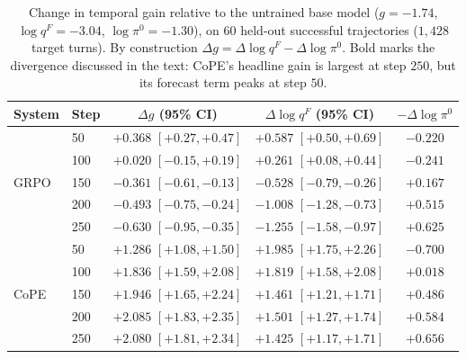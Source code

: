\begin{table}[t]
\centering
\small
\setlength{\tabcolsep}{5pt}
\begin{tabular}{llccc}
\toprule
System & Step & $\Delta g$ (95\% CI) & $\Delta \log q^{F}$ (95\% CI) & $-\Delta \log \pi^{0}$ \\
\midrule
\multirow{5}{*}{GRPO}
 & 50  & $+0.368$ \; $[+0.27, +0.47]$ & $+0.587$ \; $[+0.50, +0.69]$ & $-0.220$ \\
 & 100 & $+0.020$ \; $[-0.15, +0.19]$ & $+0.261$ \; $[+0.08, +0.44]$ & $-0.241$ \\
 & 150 & $-0.361$ \; $[-0.61, -0.13]$ & $-0.528$ \; $[-0.79, -0.26]$ & $+0.167$ \\
 & 200 & $-0.493$ \; $[-0.75, -0.24]$ & $-1.008$ \; $[-1.28, -0.73]$ & $+0.515$ \\
 & 250 & $-0.630$ \; $[-0.95, -0.35]$ & $-1.255$ \; $[-1.58, -0.97]$ & $+0.625$ \\
\midrule
\multirow{5}{*}{CoPE}
 & 50  & $+1.286$ \; $[+1.08, +1.50]$ & $\mathbf{+1.985}$ \; $[+1.75, +2.26]$ & $-0.700$ \\
 & 100 & $+1.836$ \; $[+1.59, +2.08]$ & $+1.819$ \; $[+1.58, +2.08]$ & $+0.018$ \\
 & 150 & $+1.946$ \; $[+1.65, +2.24]$ & $+1.461$ \; $[+1.21, +1.71]$ & $+0.486$ \\
 & 200 & $+2.085$ \; $[+1.83, +2.35]$ & $+1.501$ \; $[+1.27, +1.74]$ & $+0.584$ \\
 & 250 & $\mathbf{+2.080}$ \; $[+1.81, +2.34]$ & $+1.425$ \; $[+1.17, +1.71]$ & $+0.656$ \\
\bottomrule
\end{tabular}
\caption{Change in temporal gain relative to the untrained base model
($g = -1.74$, $\log q^{F} = -3.04$, $\log \pi^{0} = -1.30$), on $60$ held-out
successful trajectories ($1{,}428$ target turns). By construction
$\Delta g = \Delta \log q^{F} - \Delta \log \pi^{0}$. Bold marks the divergence
discussed in the text: CoPE's headline gain is largest at step $250$, but its
forecast term peaks at step $50$.}
\label{tab:te}
\end{table}

